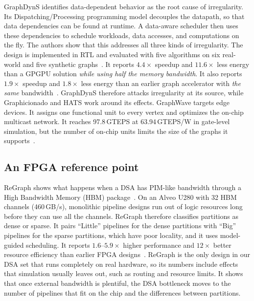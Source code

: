 \documentclass[journal,onecolumn]{IEEEtran}
\begin{document}
GraphDynS identifies data-dependent behavior as the root cause of irregularity. Its Dispatching/Processing programming model decouples the datapath, so that data dependencies can be found at runtime. A data-aware scheduler then uses these dependencies to schedule workloads, data accesses, and computations on the fly. The authors show that this addresses all three kinds of irregularity. The design is implemented in RTL and evaluated with five algorithms on six real-world and five synthetic graphs~\cite{yan2019graphdyns}. It reports $4.4\times$ speedup and $11.6\times$ less energy than a GPGPU solution \emph{while using half the memory bandwidth}. It also reports $1.9\times$ speedup and $1.8\times$ less energy than an earlier graph accelerator with \emph{the same} bandwidth~\cite{yan2019graphdyns}. GraphDynS therefore attacks irregularity at its source, while Graphicionado and HATS work around its effects. GraphWave targets edge devices. It assigns one functional unit to every vertex and optimizes the on-chip multicast network. It reaches 97.8\,GTEPS at 63.94\,GTEPS/W in gate-level simulation, but the number of on-chip units limits the size of the graphs it supports~\cite{lee2022graphwave}.

\subsection{An FPGA reference point}
ReGraph shows what happens when a DSA has PIM-like bandwidth through a High Bandwidth Memory (HBM) package~\cite{chen2022regraph}. On an Alveo U280 with 32 HBM channels (460\,GB/s), monolithic pipeline designs run out of logic resources long before they can use all the channels. ReGraph therefore classifies partitions as dense or sparse. It pairs ``Little'' pipelines for the dense partitions with ``Big'' pipelines for the sparse partitions, which have poor locality, and it uses model-guided scheduling. It reports $1.6$--$5.9\times$ higher performance and $12\times$ better resource efficiency than earlier FPGA designs~\cite{chen2022regraph}. ReGraph is the only design in our DSA set that runs completely on real hardware, so its numbers include effects that simulation usually leaves out, such as routing and resource limits. It shows that once external bandwidth is plentiful, the DSA bottleneck moves to the number of pipelines that fit on the chip and the differences between partitions.
\end{document}
